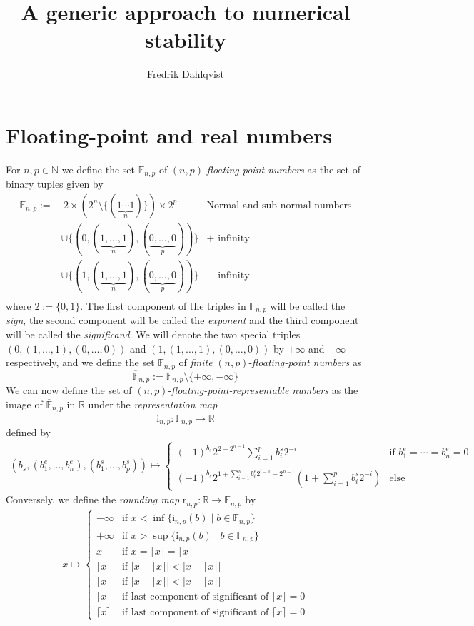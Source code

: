 \documentclass[10pt,a4paper]{article}
\title{A generic approach to numerical stability}
\author{Fredrik Dahlqvist}
\date{}
\theoremstyle{plain}
\theoremstyle{definition}
\newcommand{\F}[1][n,p]{\mathbb{F}_{#1}}
\newcommand{\Ff}[1][n,p]{\overline{\mathbb{F}}_{#1}}
\newcommand{\N}{\mathbb{N}}
\newcommand{\R}{\mathbb{R}}
\newcommand{\Rep}[1][n,p]{\mathrm{i}_{#1}}
\newcommand{\Round}[1][n,p]{\mathrm{r}_{#1}}
\newcommand{\absv}[1]{\vert #1\vert}
\newcommand{\ceil}[1]{\lceil #1 \rceil}
\newcommand{\floor}[1]{\lfloor #1 \rfloor}
\begin{document}
\maketitle

\section{Floating-point and real numbers}

For $n,p\in\N$ we define the set $\F$ of $(n,p)$-\emph{floating-point numbers} as the set of binary tuples given by
\begin{align*}
\F:=&~2\times \left(2^n\setminus\{(\underbrace{1\cdots 1}_n)\}\right)\times 2^p &\text{Normal and sub-normal numbers}\\
&\cup \{(0,(\underbrace{1,\ldots,1}_n),(\underbrace{0,\ldots, 0}_p))\}&+\text{ infinity}\\
&\cup \{(1,(\underbrace{1,\ldots,1}_n),(\underbrace{0,\ldots, 0}_p))\}&-\text{ infinity}\\
\end{align*}
where $2:=\{0,1\}$. The first component of the triples in $\F$ will be called the \emph{sign}, the second component will be called the \emph{exponent} and the third component will be called the \emph{significand}. We will denote the two special triples $(0,(1,\ldots,1),(0,\ldots, 0))$ and $(1,(1,\ldots,1),(0,\ldots, 0))$ by $+\infty$ and $-\infty$ respectively, and we define  the set $\Ff$ of \emph{finite} $(n,p)$-\emph{floating-point numbers} as 
\[
\Ff:=\F \setminus \{+\infty,-\infty\}
\]
We can now define the set of $(n,p)$-\emph{floating-point-representable numbers} as the image of $\Ff$ in $\R$ under the \emph{representation map}
\[
\Rep: \Ff \to \R
\]
defined by
\begin{align*}
(b_s,(b^e_1,\ldots,b^e_n),(b^s_1,\ldots,b^s_p))\mapsto
\begin{cases}
(-1)^{b_s}2^{2-2^{n-1}}\sum_{i=1}^p b^s_i2^{-i} & \text{if }b^e_1=\cdots=b^e_n=0\\ \\
(-1)^{b_s}2^{1+\sum_{i=1}^n b_i^e 2^{i-1} -2^{n-1}} \left(1+\sum_{i=1}^p b^s_i2^{-i}\right)& \text{else }
\end{cases}
\end{align*}
Conversely, we define the \emph{rounding map} $\Round: \R\to\F$ by
\begin{align*}
x\mapsto 
\begin{cases}
-\infty&\text{if } x< \inf\{\Rep(b)\mid b\in \Ff\}\\
+\infty&\text{if } x> \sup\{\Rep(b)\mid b\in \Ff\}\\
x&\text{if }x=\ceil{x}=\floor{x}\\
\floor{x} &\text{if } \absv{x-\floor{x}}< \absv{x-\ceil{x}} \\ 
\ceil{x} &\text{if } \absv{x-\ceil{x}}< \absv{x-\floor{x}} \\ 
\floor{x} &\text{if last component of significant of }\floor{x}=0\\ 
\ceil{x} &\text{if last component of significant of }\ceil{x}=0
\end{cases}
\end{align*}
\end{document}
